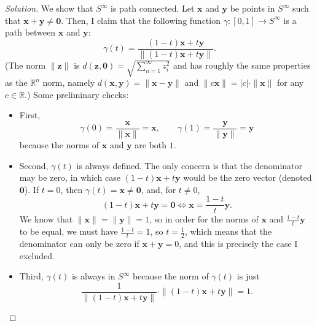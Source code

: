 \documentclass[11pt]{scrartcl}
\providecommand{\half}{\frac{1}{2}}
\providecommand{\RR}{\mathbb R}
\providecommand{\ii}{\item}
\providecommand{\mb}[1]{\mathbf{#1}}
\newenvironment{soln}{\begin{proof}[Solution]}{\end{proof}}
\begin{document}
\begin{soln}
	We show that $S^\infty$ is path connected.
	Let $\mb x$ and $\mb y$ be points in $S^\infty$
	such that $\mb x + \mb y\ne \mb 0$.
	Then, I claim that the following function $\gamma\colon[0,1]\to S^\infty$
	is a path between $\mb x$ and $\mb y$:
	\[\gamma(t) = \frac{(1-t)\mb x + t\mb y}{\|(1-t)\mb x + t\mb y\|}.\]
	(The norm $\|\mb z\|$ is $d(\mb z, \mb 0)
	= \sqrt{\sum_{n=1}^\infty z_i^2}$ and has
	roughly the same properties as the $\RR^n$ norm, namely
	$d(\mb x,\mb y) = \|\mb x - \mb y\|$ and
	$\|c\mb x\| = |c|\cdot\|\mb x\|$ for any $c\in\RR$.)
	Some preliminary checks:
	\begin{itemize}
	 	\ii First,
	 	\[\gamma(0) = \frac{\mb x}{\|\mb x\|} = \mb x,\qquad
	 	\gamma(1) = \frac{\mb y}{\|\mb y\|} = \mb y\]
	 	because the norms of $\mb x$ and $\mb y$ are both $1$.
	 	
	 	\ii Second, $\gamma(t)$ is always defined. The only concern
	 	is that the denominator may be zero, in which case
	 	$(1-t)\mb x + t\mb y$ would be the zero vector (denoted $\mb 0$).
	 	If $t = 0$, then $\gamma(t) = \mb x\ne\mb 0$, and, for $t\ne 0$,
	 	\[(1-t)\mb x + t\mb y = \mb 0 \iff \mb x = \frac{1-t}{t}\mb y.\]
	 	We know that $\|\mb x\| = \|\mb y\| = 1$,
	 	so in order for the norms of $\mb x$ and $\frac{1-t}{t}\mb y$
	 	to be equal, we must have $\frac{1-t}{t} = 1$, so $t = \half$,
	 	which means that the denominator can only be zero if
	 	$\mb x + \mb y = 0$, and this is precisely the case I excluded.
	 	
	 	\ii Third, $\gamma(t)$ is always in $S^\infty$ because
	 	the norm of $\gamma(t)$ is just
	 	\[\frac{1}{\|(1-t)\mb x + t\mb y\|}\cdot\|(1-t)\mb x + t\mb y\| = 1.\]
	\end{itemize}
	

\end{soln}
\end{document}
